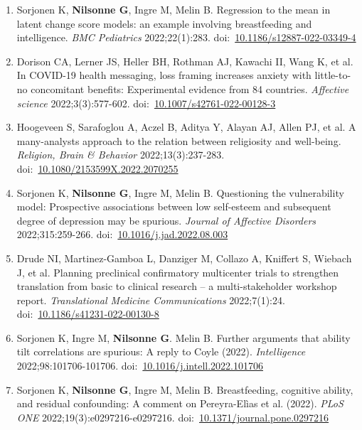 \documentclass[11pt,a4paper]{article}
\begin{document}
\begin{enumerate}
\item Sorjonen K, \textbf{Nilsonne G}, Ingre M, Melin B. Regression to the mean in latent change score models: an example involving breastfeeding and intelligence. \textit{BMC Pediatrics} 2022;22(1):283. doi:~\href{https://doi.org/10.1186/s12887-022-03349-4}{10.1186/s12887-022-03349-4}

\item Dorison CA, Lerner JS, Heller BH, Rothman AJ, Kawachi II, Wang K, et al. In COVID-19 health messaging, loss framing increases anxiety with little-to-no concomitant benefits: Experimental evidence from 84 countries. \textit{Affective science} 2022;3(3):577-602. doi:~\href{https://doi.org/10.1007/s42761-022-00128-3}{10.1007/s42761-022-00128-3}

\item Hoogeveen S, Sarafoglou A, Aczel B, Aditya Y, Alayan AJ, Allen PJ, et al. A many-analysts approach to the relation between religiosity and well-being. \textit{Religion, Brain \& Behavior} 2022;13(3):237-283. doi:~\href{https://doi.org/10.1080/2153599X.2022.2070255}{10.1080/2153599X.2022.2070255}

\item Sorjonen K, \textbf{Nilsonne G}, Ingre M, Melin B. Questioning the vulnerability model: Prospective associations between low self-esteem and subsequent degree of depression may be spurious. \textit{Journal of Affective Disorders} 2022;315:259-266. doi:~\href{https://doi.org/10.1016/j.jad.2022.08.003}{10.1016/j.jad.2022.08.003}

\item Drude NI, Martinez-Gamboa L, Danziger M, Collazo A, Kniffert S, Wiebach J, et al. Planning preclinical confirmatory multicenter trials to strengthen translation from basic to clinical research – a multi-stakeholder workshop report. \textit{Translational Medicine Communications} 2022;7(1):24. doi:~\href{https://doi.org/10.1186/s41231-022-00130-8}{10.1186/s41231-022-00130-8}

\item Sorjonen K, Ingre M, \textbf{Nilsonne G}. Melin B. Further arguments that ability tilt correlations are spurious: A reply to Coyle (2022). \textit{Intelligence} 2022;98:101706-101706. doi:~\href{https://doi.org/10.1016/j.intell.2022.101706}{10.1016/j.intell.2022.101706}

\item Sorjonen K, \textbf{Nilsonne G}, Ingre M, Melin B. Breastfeeding, cognitive ability, and residual confounding: A comment on Pereyra-Elìas et al. (2022). \textit{PLoS ONE} 2022;19(3):e0297216-e0297216. doi:~\href{https://doi.org/10.1371/journal.pone.0297216}{10.1371/journal.pone.0297216}


\end{enumerate}
\end{document}
